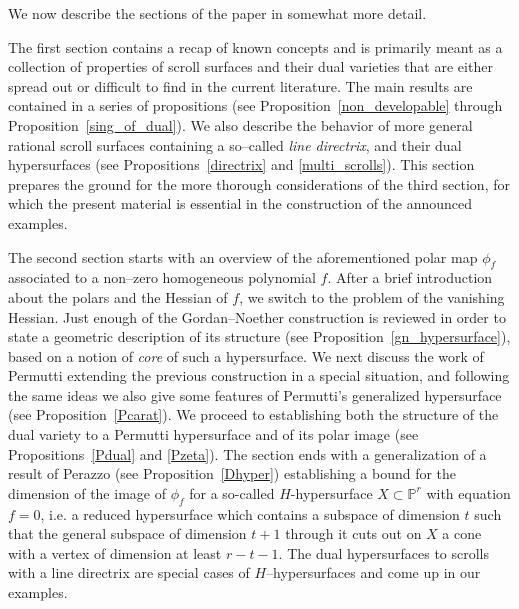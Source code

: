 \documentclass[11pt]{article}   %
\theoremstyle{definition}
\numberwithin{Theorem}{section} \numberwithin{equation}{section}
\newcommand{\p}{{\mathbb P}}
\begin{document}
We now describe the sections of the paper in somewhat more detail.

The first  section contains a {recap}
of known concepts and is primarily {meant as a
collection of} properties of scroll surfaces and their
dual varieties {that are either} spread out
or difficult to find in the current
literature. The main results are contained in a series of
propositions (see Proposition~\ref{non_developable}
through Proposition~\ref{sing_of_dual}). We also describe the
behavior of more general rational scroll surfaces containing a
so--called \emph{line directrix}, and their dual hypersurfaces (see
Propositions~\ref{directrix} and \ref{multi_scrolls}). This section
prepares the ground for the more thorough considerations of the
third  section, { for which the present
material}  is essential
 in the construction of {the
announced} examples.

The second section starts with an overview of the aforementioned
{polar map} $\phi_f$ associated to a non--zero homogeneous
 polynomial $f$. After a
brief introduction about the polars and the Hessian of $f$, we
switch to the problem of the vanishing Hessian. Just enough of the
Gordan--Noether construction is reviewed in order to state a
geometric description of its structure (see
Proposition~\ref{gn_hypersurface}), based on a notion of {\it
core\/} of such a hypersurface. We next discuss  the work of
Permutti extending the previous construction in a special situation,
and following the same ideas we also give some features of
Permutti's generalized hypersurface (see Proposition~\ref{Pcarat}).
We proceed to establishing both the structure of the dual variety to
a Permutti hypersurface and of its polar image (see
Propositions~\ref{Pdual} and \ref{Pzeta}). The section ends with a
generalization of a result of Perazzo (see Proposition~\ref{Dhyper})
establishing a bound for the dimension of the image of $\phi_f$ for
a so-called $H$-hypersurface $X\subset \p^r$ with equation $f=0$,
i.e. a reduced hypersurface which contains a subspace of dimension
$t$ such that the general subspace of dimension $t+1$ through it
cuts out on $X$ a cone with a vertex  of dimension at least $r-t-1$.
The dual hypersurfaces to scrolls with a line directrix are special
cases of $H$--hypersurfaces and come up in our examples.
\end{document}
